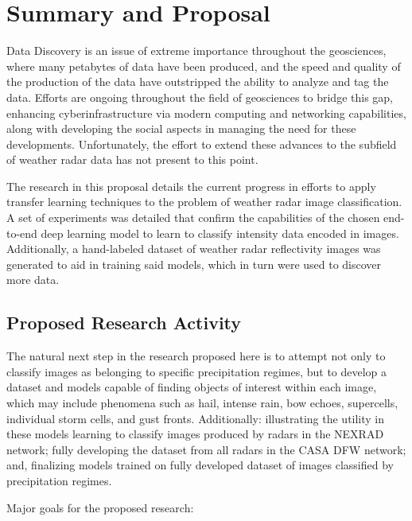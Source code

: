 \chapter{Summary and Proposal}
\label{sec:summary}

Data Discovery is an issue of extreme importance throughout the geosciences, where many petabytes of data have been produced, and the speed and quality of the production of the data have outstripped the ability to analyze and tag the data.
Efforts are ongoing throughout the field of geosciences to bridge this gap, enhancing cyberinfrastructure via modern computing and networking capabilities, along with developing the social aspects in managing the need for these developments.
Unfortunately, the effort to extend these advances to the subfield of weather radar data has not present to this point.

The research in this proposal details the current progress in efforts to apply transfer learning techniques to the problem of weather radar image classification.
A set of experiments was detailed that confirm the capabilities of the chosen end-to-end deep learning model to learn to classify intensity data encoded in images.
Additionally, a hand-labeled dataset of weather radar reflectivity images was generated to aid in training said models, which in turn were used to discover more data.


\section{Proposed Research Activity}
\label{sec:summary_proposed}

The natural next step in the research proposed here is to attempt not only to classify images as belonging to specific precipitation regimes, but to develop a dataset and models capable of finding objects of interest within each image, which may include phenomena such as hail, intense rain, bow echoes, supercells, individual storm cells, and gust fronts.
Additionally: illustrating the utility in these models learning to classify images produced by radars in the NEXRAD network; fully developing the dataset from all radars in the CASA DFW network; and, finalizing models trained on fully developed dataset of images classified by precipitation regimes.

Major goals for the proposed research:

